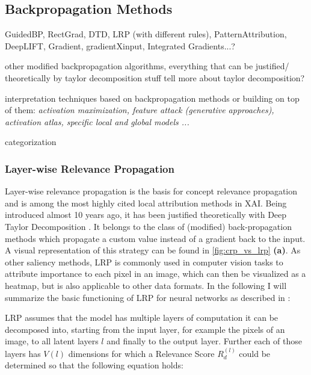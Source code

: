 \subsection{Backpropagation Methods}
GuidedBP, RectGrad, DTD, LRP (with different rules), PatternAttribution, DeepLIFT, Gradient, gradientXinput, Integrated Gradients...?

other modified backpropagation algorithms, everything that can be justified/ theoretically by taylor decomposition stuff
tell more about taylor decomposition?


interpretation techniques based on backpropagation methods or building on top of them: 
\textit{activation maximization, feature attack (generative approaches), activation atlas, specific local and global models ... }


categorization \cite{Samek2021}


\subsubsection{Layer-wise Relevance Propagation}
Layer-wise relevance propagation \cite{Bach2015} is the basis for concept relevance propagation and is among the most highly cited local attribution methods in XAI. Being introduced almost 10 years ago, it has been justified theoretically with Deep Taylor Decomposition \cite{Montavon2017}. It belongs to the class of (modified) back-propagation methods which propagate a custom value instead of a gradient back to the input. A visual representation of this strategy can be found in \cref{fig:crp_vs_lrp} \textbf{(a)}. As other saliency methods, LRP is commonly used in computer vision tasks to attribute importance to each pixel in an image, which can then be visualized as a heatmap, but is also applicable to other data formats. In the following I will summarize the basic functioning of LRP for neural networks as described in \cite{Bach2015}:

LRP assumes that the model has multiple layers of computation it can be decomposed into, starting from the input layer, for example the pixels of an image, to all latent layers $l$ and finally to the output layer. Further each of those layers has $V(l)$ dimensions for which a Relevance Score $R^{(l)}_d$ could be determined so that the following equation holds:


